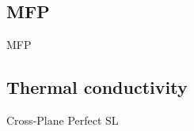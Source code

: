 \documentclass{beamer}
\begin{document}
\subsection{MFP}
\begin{frame}{MFP}
\begin{figure}[t]
\begin{center}
\vspace*{-0.8cm}
\renewcommand{\figure}{Fig.}
\label{fig:mfp_contribution}
\end{center}
\end{figure}
\end{frame}




\subsection{Thermal conductivity}
\begin{frame}{Cross-Plane Perfect SL}
\begin{figure}[t]
\begin{center}
\vspace*{-0.8cm}
\renewcommand{\figure}{Fig.}
\label{fig:cp}
\end{center}
\end{figure}
\end{frame}
\end{document}
